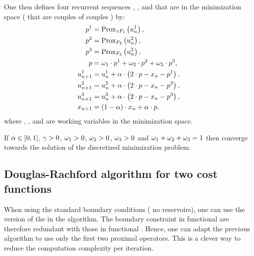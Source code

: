         One then defines four recurrent sequences , ,  and  that
        are in the minimization space (\ie{} that are couples of couples \coupleFM{}) by:
        \begin{align}
            p^1 &= \mathrm{Prox}_{\gamma F_1}\left(u^1_{n}\right),\\
            p^2 &= \mathrm{Prox}_{F_2}\left(u^2_{n}\right),\\
            p^3 &= \mathrm{Prox}_{F_3}\left(u^3_{n}\right),\\
            p &= \omega_1 \cdot p^1 + \omega_2 \cdot p^2 + \omega_3 \cdot p^3,\\
            u^1_{n+1} &= u^1_{n} + \alpha \cdot \left( 2 \cdot p - x_{n} - p^1 \right),\\
            u^2_{n+1} &= u^2_{n} + \alpha \cdot \left( 2 \cdot p - x_{n} - p^2 \right),\\
            u^3_{n+1} &= u^3_{n} + \alpha \cdot \left( 2 \cdot p - x_{n} - p^3 \right),\\
            x_{n+1} &= \left( 1 - \alpha \right) \cdot x_{n} + \alpha \cdot p,
        \end{align}
        where \drTStateP{}, \drTStatePI{}, \drTStatePII{} and \drTStatePIII{} are working variables in the minimization space.

        If $\alpha\in [0,1]$, $\gamma>0$, $\omega_1>0$, $\omega_2>0$, $\omega_3>0$ and 
        $\omega_1+\omega_2+\omega_3=1$ then  converge towards the solution of the discretized
        minimization problem.

    \subsection{Douglas-Rachford algorithm for two cost functions}
    \noindent

        When using the standard boundary conditions (\ie{} no reservoirs), one can use the  version of the 
        in the \drAlgo{} algorithm.
        The boundary constraint in functional \costIIIToMin{} are therefore redundant with those in functional
        \costIToMin{}. Hence, one can adapt the previous algorithm to use only the first two proximal operators. This is a clever
        way to reduce the computation complexity per iteration.

